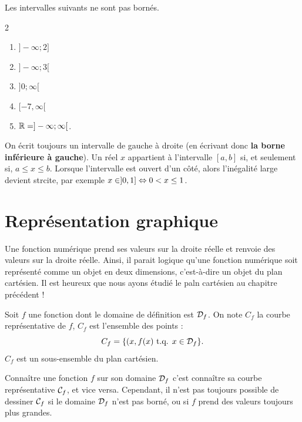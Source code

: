 \documentclass[a4paper, 12pt]{report}
\begin{document}
\begin{ex}
	Les intervalles suivants ne sont pas bornés.
	\begin{multicols}{2}
	\begin{enumerate}[label=$\bullet$]
		\item $]-\infty; 2]$
		\item $]-\infty ; 3[$
		\item $]0; \infty[$
		\item $[-7, \infty[$
		\item $\mathbb{R}=]-\infty;\infty[$.
	\end{enumerate}
	\end{multicols}
\end{ex}

\begin{rmq}
On écrit toujours un intervalle de gauche à droite (en écrivant donc \textbf{la borne inférieure à gauche}). 
Un réel $x$ appartient à l'intervalle $[a,b]$ si, et seulement si, $a\leq x \leq b$. Lorsque l'intervalle est ouvert d'un côté, alors l'inégalité large devient strcite, par exemple $x \in ]0,1] \Leftrightarrow 0<x\leq1$.
\end{rmq}
	
\section{Représentation graphique}

Une fonction numérique prend ses valeurs sur la droite réelle et renvoie des valeurs sur la droite réelle.
Ainsi, il parait logique qu'une fonction numérique soit représenté comme un objet en deux dimensions, 
c'est-à-dire un objet du plan cartésien.
Il est heureux que nous ayons étudié le paln cartésien au chapitre précédent !

\begin{defn}
Soit $f$ une fonction dont le domaine de définition est $\mathcal{D}_f$. 
On note $C_f$ la courbe représentative de $f$, $C_f$ est l'ensemble des points :
\[ C_f = \{ (x, f(x) \text{ t.q. } x \in \mathcal{D}_f \}. \]
$C_f$ est un sous-ensemble du plan cartésien.
\end{defn}

\begin{rmq}
	Connaître une fonction $f$ sur son domaine $\mathcal{D}_f$ c'est connaître sa courbe représentative $\mathcal{C}_f$, et vice versa.
	Cependant, il n'est pas toujours possible de dessiner $\mathcal{C}_f$ si le domaine $\mathcal{D}_f$ n'est pas borné, ou si $f$ prend des valeurs toujours plus grandes.
\end{rmq}
\end{document}
